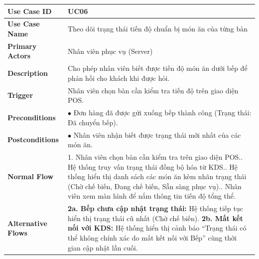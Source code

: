 \begin{longtable}{|p{3.5cm}|p{12.5cm}|}
\hline
\textbf{Use Case ID} & UC06 \\ \hline
\textbf{Use Case Name} & Theo dõi trạng thái tiến độ chuẩn bị món ăn của từng bàn \\ \hline
\textbf{Primary Actors} & Nhân viên phục vụ (Server) \\ \hline
\textbf{Description} & Cho phép nhân viên biết được tiến độ món ăn dưới bếp để phản hồi cho khách khi được hỏi. \\ \hline
\textbf{Trigger} & Nhân viên chọn bàn cần kiểm tra tiến độ trên giao diện POS. \\ \hline
\textbf{Preconditions} & $\bullet$ Đơn hàng đã được gửi xuống bếp thành công (Trạng thái: Đã chuyển bếp). \\ \hline
\textbf{Postconditions} & $\bullet$ Nhân viên nhận biết được trạng thái mới nhất của các món ăn. \\ \hline
\textbf{Normal Flow} &
1. Nhân viên chọn bàn cần kiểm tra trên giao diện POS.\newline
2. Hệ thống truy vấn trạng thái đồng bộ hóa từ KDS.\newline
3. Hệ thống hiển thị danh sách các món ăn kèm nhãn trạng thái (Chờ chế biến, Đang chế biến, Sẵn sàng phục vụ).\newline
4. Nhân viên xem màn hình để nắm thông tin tiến độ tổng thể. \\ \hline
\textbf{Alternative Flows} &
\textbf{2a. Bếp chưa cập nhật trạng thái:} Hệ thống tiếp tục hiển thị trạng thái cũ nhất (Chờ chế biến).\newline
\textbf{2b. Mất kết nối với KDS:} Hệ thống hiển thị cảnh báo ``Trạng thái có thể không chính xác do mất kết nối với Bếp'' cùng thời gian cập nhật lần cuối. \\ \hline
\end{longtable}

